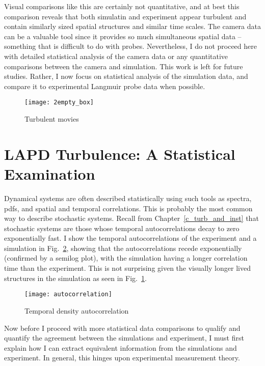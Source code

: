 Visual comparisons like this are certainly not quantitative, and at best this comparison
reveals that both simulatin and experiment appear turbulent and contain similarly sized spatial structures and similar time scales. The camera data can be a valuable tool since it provides
so much simultaneous spatial data -- something that is difficult to do with probes. Nevertheless, I do not proceed here with detailed statistical analysis of the camera data or any
quantitative comparisons between the camera and simulation. This work is left for future studies. Rather, I now focus on statistical analysis of the simulation data, and compare it to
experimental Langmuir probe data when possible.


\begin{figure}[!ht]
\centerline{\texttt{[image: 2empty\_box]}}
\caption{Turbulent movies}
\label{sim_v_exp_anim}
\end{figure}


\section{LAPD Turbulence: A Statistical Examination}
\label{s_stat_exam}

Dynamical systems are often described statistically using such tools as spectra, pdfs, and spatial and temporal correlations. This is probably the most common way to describe stochastic systems.
Recall from Chapter~\ref{c_turb_and_inst} that stochastic systems are those whose temporal autocorrelations decay to zero exponentially fast. I show the temporal autocorrelations of the experiment
and a simulation in Fig.~\ref{autocorrelation}, 
showing that the autocorrelations recede exponentially (confirmed by a semilog plot), with the simulation having a longer correlation time than the experiment. This is not
surprising given the visually longer lived structures in the simulation as seen in Fig.~\ref{sim_v_exp_anim}.


\begin{figure}[!ht]
\centerline{\texttt{[image: autocorrelation]}}
\caption{Temporal density autocorrelation}
\label{autocorrelation}
\end{figure}

Now before I proceed with more statistical data comparisons to qualify and quantify the agreement between the simulations and experiment, I must first explain how I can extract
equivalent information from the simulations and experiment. In general, this hinges upon experimental measurement theory.

